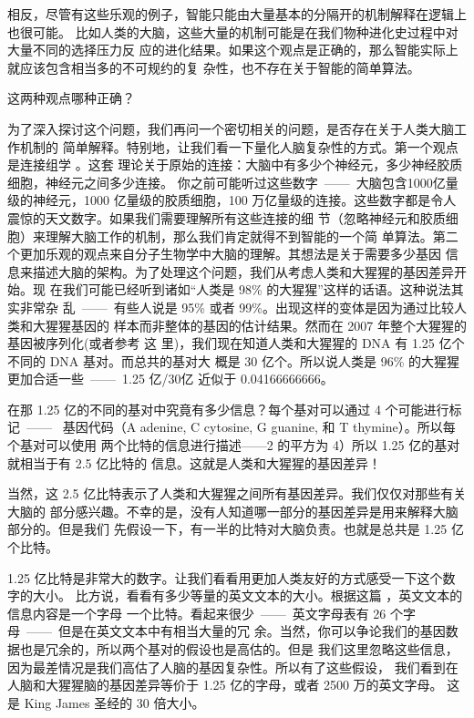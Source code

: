 相反，尽管有这些乐观的例子，智能只能由大量基本的分隔开的机制解释在逻辑上也很可能。
比如人类的大脑，这些大量的机制可能是在我们物种进化史过程中对大量不同的选择压力反
应的进化结果。如果这个观点是正确的，那么智能实际上就应该包含相当多的不可规约的复
杂性，也不存在关于智能的简单算法。

这两种观点哪种正确？

为了深入探讨这个问题，我们再问一个密切相关的问题，是否存在关于人类大脑工作机制的
简单解释。特别地，让我们看一下量化人脑复杂性的方式。第一个观点是连接组学 。这套
理论关于原始的连接：大脑中有多少个神经元，多少神经胶质细胞，神经元之间多少连接。
你之前可能听过这些数字~——~大脑包含1000亿量级的神经元，1000 亿量级的胶质细胞，100
万亿量级的连接。这些数字都是令人震惊的天文数字。如果我们需要理解所有这些连接的细
节（忽略神经元和胶质细胞）来理解大脑工作的机制，那么我们肯定就得不到智能的一个简
单算法。第二个更加乐观的观点来自分子生物学中大脑的理解。其想法是关于需要多少基因
信息来描述大脑的架构。为了处理这个问题，我们从考虑人类和大猩猩的基因差异开始。现
在我们可能已经听到诸如“人类是 98\% 的大猩猩”这样的话语。这种说法其实非常杂
乱~——~有些人说是 95\% 或者 99\%。出现这样的变体是因为通过比较人类和大猩猩基因的
样本而非整体的基因的估计结果。然而在 2007 年整个大猩猩的基因被序列化(或者参考 这
里)，我们现在知道人类和大猩猩的 DNA 有 1.25 亿个不同的 DNA 基对。而总共的基对大
概是 30 亿个。所以说人类是 96\% 的大猩猩更加合适一些~——~1.25 亿/30亿 近似于
0.04166666666。

在那 1.25 亿的不同的基对中究竟有多少信息？每个基对可以通过 4 个可能进行标记~——~
基因代码（A adenine, C cytosine, G guanine, 和 T thymine）。所以每个基对可以使用
两个比特的信息进行描述——2 的平方为 4）所以 1.25 亿的基对就相当于有 2.5 亿比特的
  信息。这就是人类和大猩猩的基因差异！

当然，这 2.5 亿比特表示了人类和大猩猩之间所有基因差异。我们仅仅对那些有关大脑的
部分感兴趣。不幸的是，没有人知道哪一部分的基因差异是用来解释大脑部分的。但是我们
先假设一下，有一半的比特对大脑负责。也就是总共是 1.25 亿个比特。

1.25 亿比特是非常大的数字。让我们看看用更加人类友好的方式感受一下这个数字的大小。
比方说，看看有多少等量的英文文本的大小。根据这篇 ，英文文本的信息内容是一个字母
一个比特。看起来很少~——~英文字母表有 26 个字母~——~但是在英文文本中有相当大量的冗
余。当然，你可以争论我们的基因数据也是冗余的，所以两个基对的假设也是高估的。但是
我们这里忽略这些信息，因为最差情况是我们高估了人脑的基因复杂性。所以有了这些假设，
我们看到在人脑和大猩猩脑的基因差异等价于 1.25 亿的字母，或者 2500 万的英文字母。
这是 King James 圣经的 30 倍大小。

